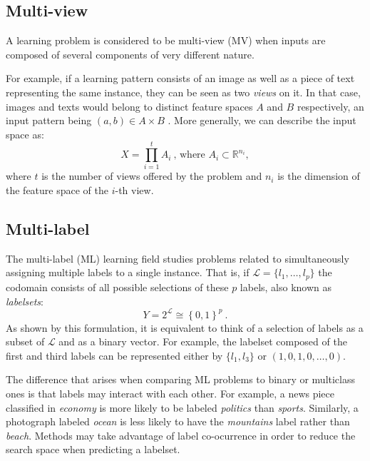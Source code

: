 \subsection{Multi-view}
\label{p3sec:mview}

A learning problem is considered to be multi-view (MV) \cite{mviewl} when inputs are composed of several components of very different nature. 

For example, if a learning pattern consists of an image as well as a piece of text representing the same instance, they can be seen as two \emph{views} on it. In that case, images and texts would belong to distinct feature spaces $A$ and $B$ respectively, an input pattern being $(a,b)\in A\times B$ . More generally, we can describe the input space as:
\begin{equation}
  X=\prod_{i=1}^{t}A_{i}~\mbox{, where }A_i\subset\mathbb R^{n_i},
  \end{equation}
where $t$ is the number of views offered by the problem and $n_i$ is the dimension of the feature space of the $i$-th view.

\subsection{Multi-label}
\label{p3sec:mlabel}

The multi-label (ML) learning field \cite{mlc,mltutorial} studies problems related to simultaneously assigning multiple labels to a single instance. That is, if $\mathcal L = \{l_1,\dots,l_p\}$ the codomain consists of all possible selections of these $p$ labels, also known as \emph{labelsets}:
\begin{equation}
  Y=2^{\mathcal L}\cong\left\{0,1\right\}^p~.
  \end{equation} 
As shown by this formulation, it is equivalent to think of a selection of labels as a subset of $\mathcal L$ and as a binary vector. For example, the labelset composed of the first and third labels can be represented either by $\{l_1,l_3\}$ or $(1,0,1,0,\dots,0)$.


The difference that arises when comparing ML problems to binary or multiclass ones is that labels may interact with each other. For example, a news piece classified in \emph{economy} is more likely to be labeled \emph{politics} than \emph{sports}. Similarly, a photograph labeled \emph{ocean} is less likely to have the \emph{mountains} label rather than \emph{beach}. Methods may take advantage of label co-ocurrence \cite{scumble} in order to reduce the search space when predicting a labelset. 


